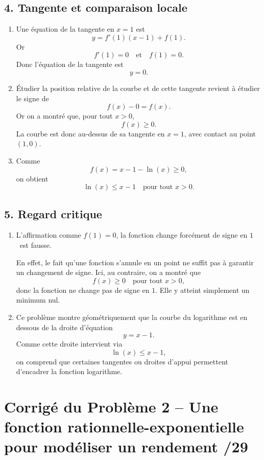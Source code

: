 \documentclass[11pt,a4paper]{article}
\begin{document}
\subsection*{4. Tangente et comparaison locale}

\begin{enumerate}
    \item Une équation de la tangente en \(x=1\) est
    \[
    y=f'(1)(x-1)+f(1).
    \]
    Or
    \[
    f'(1)=0 \quad \text{et} \quad f(1)=0.
    \]
    Donc l'équation de la tangente est
    \[
    y=0.
    \]

    \item Étudier la position relative de la courbe et de cette tangente revient à étudier le signe de
    \[
    f(x)-0=f(x).
    \]
    Or on a montré que, pour tout \(x>0\),
    \[
    f(x)\geq 0.
    \]
    La courbe est donc au-dessus de sa tangente en \(x=1\), avec contact au point \((1,0)\).

    \item Comme
    \[
    f(x)=x-1-\ln(x)\geq 0,
    \]
    on obtient
    \[
    \ln(x)\leq x-1 \quad \text{pour tout } x>0.
    \]
\end{enumerate}

\subsection*{5. Regard critique}

\begin{enumerate}
    \item L'affirmation \og comme \(f(1)=0\), la fonction change forcément de signe en \(1\) \fg\ est fausse.

    En effet, le fait qu'une fonction s'annule en un point ne suffit pas à garantir un changement de signe. Ici, au contraire, on a montré que
    \[
    f(x)\geq 0 \quad \text{pour tout } x>0,
    \]
    donc la fonction ne change pas de signe en \(1\). Elle y atteint simplement un minimum nul.

    \item Ce problème montre géométriquement que la courbe du logarithme est en dessous de la droite d'équation
    \[
    y=x-1.
    \]
    Comme cette droite intervient via
    \[
    \ln(x)\leq x-1,
    \]
    on comprend que certaines tangentes ou droites d'appui permettent d'encadrer la fonction logarithme.
\end{enumerate}

\newpage

\section*{Corrigé du Problème 2 -- Une fonction rationnelle-exponentielle pour modéliser un rendement \hfill /29}
\end{document}
